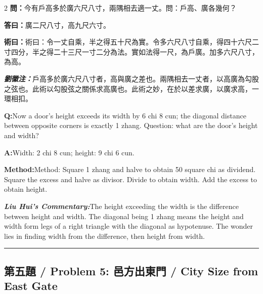 \documentclass[11pt,a4paper]{article}
\newcommand{\cnwen}{\textcolor{cnlabelfg}{\textbf{問：}}}
\newcommand{\cnda}{\textbf{答曰：}}
\newcommand{\cnshu}{\textcolor{cnlabelfg}{\textbf{術曰：}}}
\newcommand{\cnzhu}{\textcolor{commentarycolor}{\textit{\textbf{劉徽注：}}}}
\newcommand{\enwen}{\textcolor{enlabelfg}{\textbf{Q:}}}
\newcommand{\enda}{\textcolor{enlabelfg}{\textbf{A:}}}
\newcommand{\enshu}{\textcolor{enlabelfg}{\textbf{Method:}}}
\newcommand{\enzhu}{\textcolor{enlabelfg}{\textit{\textbf{Liu Hui's Commentary:}}}}
\begin{document}
\begin{paracol}{2}
\switchcolumn[0]
\cnwen 今有戶高多於廣六尺八寸，兩隅相去適一丈。問：戶高、廣各幾何？

\cnda 廣二尺八寸，高九尺六寸。

\cnshu 術曰：令一丈自乘，半之得五十尺為實。令多六尺八寸自乘，得四十六尺二寸四分，半之得二十三尺一寸二分為法。實如法得一尺，為戶廣。加多六尺八寸，為高。

\cnzhu 戶高多於廣六尺八寸者，高與廣之差也。兩隅相去一丈者，以高廣為勾股之弦也。此術以勾股弦之關係求高廣也。此術之妙，在於以差求廣，以廣求高，一環相扣。

\switchcolumn[1]
\enwen Now a door's height exceeds its width by 6 chi 8 cun; the diagonal distance between opposite corners is exactly 1 zhang. Question: what are the door's height and width?

\enda Width: 2 chi 8 cun; height: 9 chi 6 cun.

\enshu Method: Square 1 zhang and halve to obtain 50 square chi as dividend. Square the excess and halve as divisor. Divide to obtain width. Add the excess to obtain height.

\enzhu The height exceeding the width is the difference between height and width. The diagonal being 1 zhang means the height and width form legs of a right triangle with the diagonal as hypotenuse. The wonder lies in finding width from the difference, then height from width.
\end{paracol}

\bigskip\hrule\bigskip

\subsection{第五題 / Problem 5: 邑方出東門 / City Size from East Gate}
\end{document}
